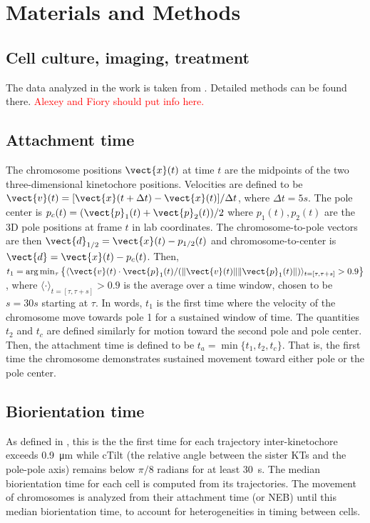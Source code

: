 \documentclass[times, twoside,onecolumn]{zHenriquesLab-StyleBioRxiv}
\begin{document}
{\footnotesize 
\section*{Materials and Methods}


\subsection*{Cell culture, imaging, treatment}
The data analyzed in the work is taken from \cite{Renda2022}. Detailed methods can be found there. 
\textcolor{red}{Alexey and Fiory should put info here.}

\subsection*{Attachment time}

The chromosome positions $\vect{x}(t)$ at time $t$ are the midpoints of the two three-dimensional kinetochore positions. Velocities are defined to be $\vect{v}(t)=[\vect{x}(t+\Delta t)-\vect{x}(t)]/\Delta t$, where $\Delta t = 5\si{s}$. The pole center is $p_c(t)=(\vect{p}_1(t)+\vect{p}_2(t))/2$ where $p_1(t),p_2(t)$ are the 3D pole positions at frame $t$ in lab coordinates. The chromosome-to-pole vectors are then $\vect{d}_{1/2} = \vect{x}(t)-p_{1/2}(t)$ and chromosome-to-center is $\vect{d} = \vect{x}(t)-p_{c}(t)$. Then, $t_1 =  \arg\min_\tau \left \{\langle    \vect{v}(t) \cdot \vect{p}_1(t)/ ( \|\vect{v}(t)\|  \| \vect{p}_1(t)\|) \rangle_{t=[\tau,\tau+s]}>0.9\right\}$, where $\langle \cdot \rangle_{t=[\tau,\tau+s]}>0.9$ is the average over a time window, chosen to be $s=30\si{s}$ starting at $\tau$. In words, $t_1$ is the first time where the velocity of the chromosome move towards pole 1 for a sustained window of time. The quantities $t_2$ and $t_c$ are defined similarly for motion toward the second pole and pole center. Then, the attachment time is defined to be $t_a = \min\{t_1,t_2,t_c\}$. That is, the first time the chromosome demonstrates sustained movement toward either pole or the pole center. 

\subsection*{Biorientation time} As defined in \cite{Renda2022}, this is the the first time for each trajectory inter-kinetochore exceeds \SI{0.9}{\um} while cTilt (the relative angle between the sister KTs and the pole-pole axis) remains below $\pi/8$ radians for at least \SI{30}{s}. The median biorientation time for each cell is computed from its trajectories. The movement of chromosomes is analyzed from their attachment time (or NEB) until this median biorientation time, to account for heterogeneities in timing between cells.

}
\end{document}
